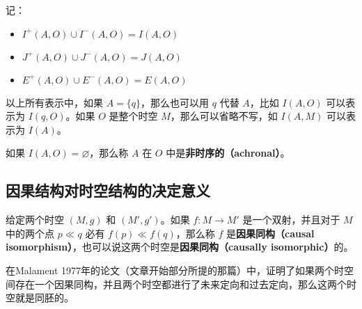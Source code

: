记：
\begin{itemize}
\item $I^+(A, O)\cup I^-(A, O)=I(A,O)$
\item $J^+(A, O)\cup J^-(A, O)=J(A,O)$
\item $E^+(A, O)\cup E^-(A, O)=E(A,O)$
\end{itemize}

以上所有表示中，如果 $A=\{q\}$，那么也可以用 $q$ 代替 $A$，比如 $I(A, O)$ 可以表示为 $I(q, O)$。如果 $O$ 是整个时空 $M$，那么可以省略不写，如 $I(A, M)$ 可以表示为 $I(A)$。

如果 $I(A, O)=\varnothing$，那么称 $A$ 在 $O$ 中是\textbf{非时序的（achronal）}。

\subsection{因果结构对时空结构的决定意义}

给定两个时空 $(M, g)$ 和 $(M', g')$。如果 $f:M\rightarrow M'$ 是一个双射，并且对于 $M$ 中的两个点 $p\ll q$ 必有 $f(p)\ll f(q)$，那么称 $f$ 是\textbf{因果同构（causal isomorphism）}，也可以说这两个时空是\textbf{因果同构（causally isomorphic）}的。

在Malament 1977年的论文（文章开始部分所提的那篇）中，证明了如果两个时空间存在一个因果同构，并且两个时空都进行了未来定向和过去定向，那么这两个时空就是同胚的。







